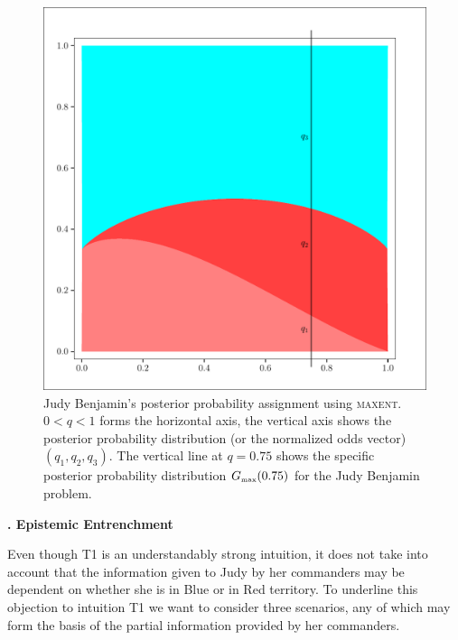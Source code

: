 \documentclass[12pt]{article}
\newcommand{\kapt}[1]{\textbf{{\thechap}. #1}\addtocounter{chap}{1}}
\def\lwv{.6}
\begin{document}
\begin{figure}[h]
  \begin{flushright}
    \begin{minipage}[h]{\lwv\linewidth}
      \includegraphics[width=\textwidth]{zeroone-mxnt.pdf}
      \caption{Judy Benjamin's posterior probability assignment using
        \textsc{maxent}. $0<q<1$ forms the horizontal axis, the
        vertical axis shows the posterior probability distribution (or
        the normalized odds vector) $(q_{1},q_{2},q_{3})$. The
        vertical line at $q=0.75$ shows the specific posterior
        probability distribution $G_{\mbox{\tiny max}}(0.75)$ for the Judy
        Benjamin problem.}
      \label{fig:mxnt}
    \end{minipage}
  \end{flushright}
\end{figure}

\kapt{Epistemic Entrenchment}

Even though T1 is an understandably strong intuition, it does not take
into account that the information given to Judy by her commanders may
be dependent on whether she is in Blue or in Red territory. To
underline this objection to intuition T1 we want to consider three
scenarios, any of which may form the basis of the partial information
provided by her commanders.
\end{document}
